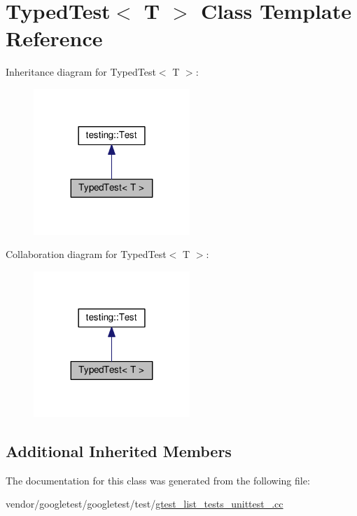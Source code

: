 \hypertarget{classTypedTest}{}\section{Typed\+Test$<$ T $>$ Class Template Reference}
\label{classTypedTest}


Inheritance diagram for Typed\+Test$<$ T $>$\+:
\nopagebreak
\begin{figure}[H]
\begin{center}
\leavevmode
\includegraphics[width=167pt]{classTypedTest__inherit__graph}
\end{center}
\end{figure}


Collaboration diagram for Typed\+Test$<$ T $>$\+:
\nopagebreak
\begin{figure}[H]
\begin{center}
\leavevmode
\includegraphics[width=167pt]{classTypedTest__coll__graph}
\end{center}
\end{figure}
\subsection*{Additional Inherited Members}


The documentation for this class was generated from the following file\+:\begin{DoxyCompactItemize}
\item 
vendor/googletest/googletest/test/\hyperlink{gtest__list__tests__unittest___8cc}{gtest\+\_\+list\+\_\+tests\+\_\+unittest\+\_\+.\+cc}\end{DoxyCompactItemize}
